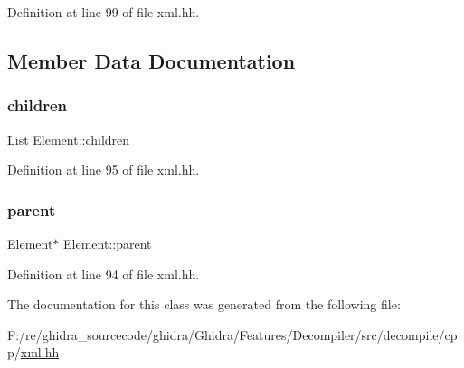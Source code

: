 Definition at line 99 of file xml.\+hh.



\subsection{Member Data Documentation}
\mbox{\label{class_element_a74557a312f8a7edfca63321f31fdad8d}} 
\subsubsection{\texorpdfstring{children}{children}}
{\footnotesize\ttfamily \mbox{\hyperlink{xml_8hh_ab5ab62f46b3735557c125f91b40ac155}{List}} Element\+::children\hspace{0.3cm}{\ttfamily [protected]}}



Definition at line 95 of file xml.\+hh.

\mbox{\label{class_element_ae9b2bd00c9ba7a16c9981142c9e41fe3}} 
\subsubsection{\texorpdfstring{parent}{parent}}
{\footnotesize\ttfamily \mbox{\hyperlink{class_element}{Element}}$\ast$ Element\+::parent\hspace{0.3cm}{\ttfamily [protected]}}



Definition at line 94 of file xml.\+hh.



The documentation for this class was generated from the following file\+:\begin{DoxyCompactItemize}
\item 
F\+:/re/ghidra\+\_\+sourcecode/ghidra/\+Ghidra/\+Features/\+Decompiler/src/decompile/cpp/\mbox{\hyperlink{xml_8hh}{xml.\+hh}}\end{DoxyCompactItemize}
